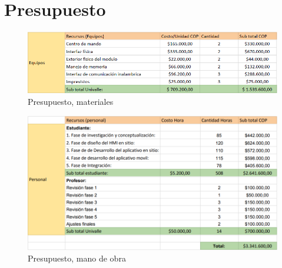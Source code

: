 \section{Presupuesto}

\begin{figure}[htbp]
	\centering
		\includegraphics[width=15cm]{figuras/presupuesto_fisico.PNG}
	\caption{Presupuesto, materiales}	
	\label{Presupuesto, materiales }
\end{figure}

\begin{figure}[htbp]
	\centering
		\includegraphics[width=15cm]{figuras/presupuesto_mano_de_obra.PNG}
	\caption{Presupuesto, mano de obra}	
	\label{Presupuesto, mano de obra}
\end{figure}

